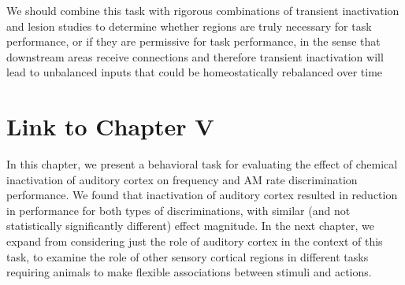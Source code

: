 We should combine this task with rigorous combinations of transient inactivation and lesion studies to determine whether regions are truly necessary for task performance, or if they are permissive for task performance, in the sense that downstream areas receive connections and therefore transient inactivation will lead to unbalanced inputs that could be homeostatically rebalanced over time

\section{Link to Chapter V}
In this chapter, we present a behavioral task for evaluating the effect of chemical inactivation of auditory cortex on frequency and AM rate discrimination performance. 
%
We found that inactivation of auditory cortex resulted in reduction in performance for both types of discriminations, with similar (and not statistically significantly different) effect magnitude. 
%
In the next chapter, we expand from considering just the role of auditory cortex in the context of this task, to examine the role of other sensory cortical regions in different tasks requiring animals to make flexible associations between stimuli and actions. 
